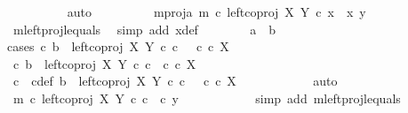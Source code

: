 \begin{isabellebody}
\ \ \ \ \ \ \ \ \isamarkupfalse%
\ auto\isanewline
\ \ \ \ \ \ \isamarkupfalse%
\ \isamarkupfalse%
\ m{\isacharunderscore}{\kern0pt}proj{\isacharunderscore}{\kern0pt}a{\isacharcolon}{\kern0pt}\ {\isachardoublequoteopen}m\ {\isasymcirc}\isactrlsub c\ left{\isacharunderscore}{\kern0pt}coproj\ X\ Y\ {\isasymcirc}\isactrlsub c\ x\ {\isacharequal}{\kern0pt}\ {\isasymlangle}x{\isacharcomma}{\kern0pt}\ y{}{\isasymrangle}{\isachardoublequoteclose}\isanewline
\ \ \ \ \ \ \ \ \isamarkupfalse%
\ m{\isacharunderscore}{\kern0pt}leftproj{\isacharunderscore}{\kern0pt}l{\isacharunderscore}{\kern0pt}equals\ \isamarkupfalse%
\ {\isacharparenleft}{\kern0pt}simp\ add{\isacharcolon}{\kern0pt}\ x{\isacharunderscore}{\kern0pt}def{\isacharparenright}{\kern0pt}\isanewline
\ \ \ \ \ \ \isamarkupfalse%
\ {\isachardoublequoteopen}a\ {\isacharequal}{\kern0pt}\ b{\isachardoublequoteclose}\isanewline
\ \ \ \ \ \ \isamarkupfalse%
{\isacharparenleft}{\kern0pt}cases\ {\isachardoublequoteopen}{\isasymexists}c{\isachardot}{\kern0pt}\ b\ {\isacharequal}{\kern0pt}\ left{\isacharunderscore}{\kern0pt}coproj\ X\ Y\ {\isasymcirc}\isactrlsub c\ c\ \ {\isasymand}\ c\ {\isasymin}\isactrlsub c\ X{\isachardoublequoteclose}{\isacharparenright}{\kern0pt}\isanewline
\ \ \ \ \ \ \ \ \isamarkupfalse%
\ {\isachardoublequoteopen}{\isasymexists}c{\isachardot}{\kern0pt}\ b\ {\isacharequal}{\kern0pt}\ left{\isacharunderscore}{\kern0pt}coproj\ X\ Y\ {\isasymcirc}\isactrlsub c\ c\ {\isasymand}\ c\ {\isasymin}\isactrlsub c\ X{\isachardoublequoteclose}\isanewline
\ \ \ \ \ \ \ \ \isamarkupfalse%
\ \isamarkupfalse%
\ c\ \ c{\isacharunderscore}{\kern0pt}def{\isacharcolon}{\kern0pt}\ {\isachardoublequoteopen}b\ {\isacharequal}{\kern0pt}\ left{\isacharunderscore}{\kern0pt}coproj\ X\ Y\ {\isasymcirc}\isactrlsub c\ c\ \ {\isasymand}\ c\ {\isasymin}\isactrlsub c\ X{\isachardoublequoteclose}\isanewline
\ \ \ \ \ \ \ \ \ \ \isamarkupfalse%
\ auto\isanewline
\ \ \ \ \ \ \ \ \isamarkupfalse%
\ \isamarkupfalse%
\ {\isachardoublequoteopen}m\ {\isasymcirc}\isactrlsub c\ left{\isacharunderscore}{\kern0pt}coproj\ X\ Y\ {\isasymcirc}\isactrlsub c\ c\ {\isacharequal}{\kern0pt}\ {\isasymlangle}c{\isacharcomma}{\kern0pt}\ y{}{\isasymrangle}{\isachardoublequoteclose}\isanewline
\ \ \ \ \ \ \ \ \ \ \isamarkupfalse%
\ {\isacharparenleft}{\kern0pt}simp\ add{\isacharcolon}{\kern0pt}\ m{\isacharunderscore}{\kern0pt}leftproj{\isacharunderscore}{\kern0pt}l{\isacharunderscore}{\kern0pt}equals{\isacharparenright}{\kern0pt}\isanewline

\end{isabellebody}
